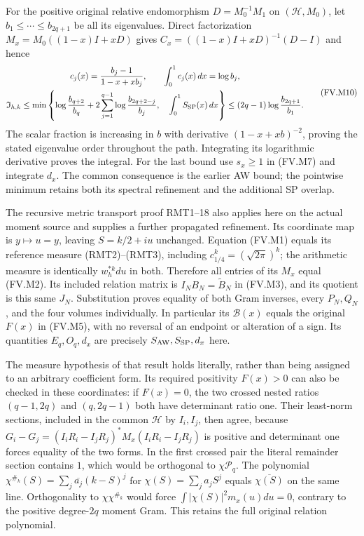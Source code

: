 For the positive original relative endomorphism $D=M_0^{-1}M_1$
on $(\mathcal H,M_0)$, let $b_1\le\cdots\le b_{2q+1}$ be all
its eigenvalues. Direct factorization
$M_x=M_0((1-x)I+xD)$ gives
$C_x=((1-x)I+xD)^{-1}(D-I)$ and hence
\[
 \begin{gathered}
 c_j(x)=\frac{b_j-1}{1-x+xb_j},\qquad
 \int_0^1c_j(x)\,dx=\log b_j,\\
 \mathfrak I_{h,k}\le
 \min\left\{\log\frac{b_{q+2}}{b_q}
     +2\sum_{j=1}^{q-1}\log\frac{b_{2q+2-j}}{b_j},\quad
                    \int_0^1S_{\rm SP}(x)\,dx\right\}
 \le(2q-1)\log\frac{b_{2q+1}}{b_1}.
 \end{gathered}\tag{FV.M10}\label{fvmetric:eigenvalues}
\]
The scalar fraction is increasing in $b$ with derivative
$(1-x+xb)^{-2}$, proving the stated eigenvalue order throughout the
path. Integrating its logarithmic derivative proves the integral.
For the last bound use $s_x\ge1$ in (FV.M7) and integrate $d_x$.
The common consequence is the earlier AW bound; the pointwise minimum
retains both its spectral refinement and the additional SP overlap.

The recursive metric transport proof RMT1--18 also applies here on the
actual moment source and supplies a further propagated refinement.
Its coordinate map is $y\mapsto u=y$, leaving $S=k/2+iu$ unchanged.
Equation (FV.M1) equals its reference measure (RMT2)--(RMT3), including
$c_{1/4}^k=(\sqrt{2\pi})^k$; the arithmetic measure is identically
$w_h^{*k}du$ in both. Therefore all entries of its $M_x$ equal (FV.M2).
Its included relation matrix is $I_NB_N=\widetilde B_N$ in (FV.M3),
and its quotient is this same $J_N$. Substitution proves equality of
both Gram inverses, every $P_N,Q_N$, and the four volumes individually.
In particular its $\mathcal B(x)$ equals the original $F(x)$ in (FV.M5),
with no reversal of an endpoint or alteration of a sign. Its quantities
$E_q,O_q,d_x$ are precisely $S_{\rm AW},S_{\rm SP},d_x$ here.

The measure hypothesis of that result holds literally, rather than being
assigned to an arbitrary coefficient form. Its required positivity
$F(x)>0$ can also be checked in these coordinates: if $F(x)=0$,
the two crossed nested ratios $(q-1,2q)$ and $(q,2q-1)$ both have
determinant ratio one. Their least-norm sections, included in the common
$\mathcal H$ by $I_i,I_j$, then agree, because
$G_i-G_j=(I_iR_i-I_jR_j)^*M_x(I_iR_i-I_jR_j)$ is positive and determinant one
forces equality of the two forms. In the first crossed pair the literal
remainder section contains $1$, which would be orthogonal to
$\chi\mathcal P_q$. The polynomial
$\chi^{\#_k}(S)=\sum_j\overline{a_j}(k-S)^j$ for
$\chi(S)=\sum_j a_jS^j$ equals $\overline{\chi(S)}$ on the same
line. Orthogonality to $\chi\chi^{\#_k}$ would force
$\int|\chi(S)|^2m_x(u)du=0$, contrary to the positive degree-$2q$
moment Gram. This retains the full original relation polynomial.

